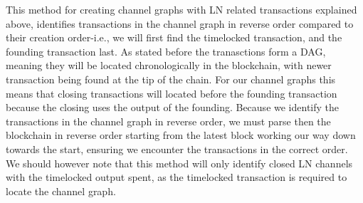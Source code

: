 This method for creating channel graphs with LN related transactions explained above, identifies transactions in the channel graph in reverse order compared to their creation order-i.e., we will first find the timelocked transaction, and the founding transaction last. As stated before the tranasctions form a DAG, meaning they will be located chronologically in the blockchain, with newer transaction being found at the tip of the chain. For our channel graphs this means that closing transactions will located before the founding transaction because the closing uses the output of the founding.
Because we identify the transactions in the channel graph in reverse order, we must parse then the blockchain in reverse order starting from the latest block working our way down towards the start, ensuring we encounter the transactions in the correct order. 
We should however note that this method will only identify closed LN channels with the timelocked output spent, as the timelocked transaction is required to locate the channel graph. 
\\

